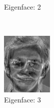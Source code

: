 \documentclass[12pt]{article}
\begin{document}
\begin{figure}
\begin{subfigure}[b]{0.20\textwidth}
		\caption{Eigenface: 2}
	\end{subfigure}\\
	\begin{subfigure}[b]{0.20\textwidth}
		\includegraphics[width=\textwidth]{Task4.6_Images/PrincipalComponent3.jpg}
		\caption{Eigenface: 3}
	\end{subfigure}\quad
	\begin{subfigure}[b]{0.20\textwidth}

\end{subfigure}
\end{figure}
\end{document}
